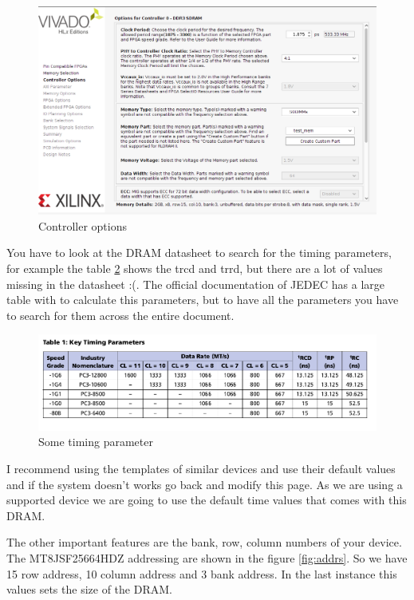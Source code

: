 \begin{figure}
    \centering
    \includegraphics[scale=0.2]{img/mig_1.png}
    \caption{Controller options}
    \label{fig:mig_1}
\end{figure}

You have to look at the DRAM datasheet to search for the timing parameters, for example the table \ref{fig:timing} shows the trcd and trrd, but there are a lot of values missing in the datasheet :(. 
The official documentation of JEDEC has a large table with to calculate this parameters, but to have all the parameters you have to search for them across the entire document.

\begin{figure}
    \centering
    \includegraphics[scale=0.35]{img/timing_parameter.png}
    \caption{Some timing parameter}
    \label{fig:timing}
\end{figure}


I recommend using the templates of similar devices and use their default values and if the system doesn't works go back and modify this page. As we are using a supported device we are going to use the default time values that comes with this DRAM.

The other important features are the bank, row, column numbers of your device. The MT8JSF25664HDZ addressing are shown in the figure \ref{fig:addrs}. So we have 15 row address, 10 column address and 3 bank address. In the last instance this values sets the size of the DRAM.

